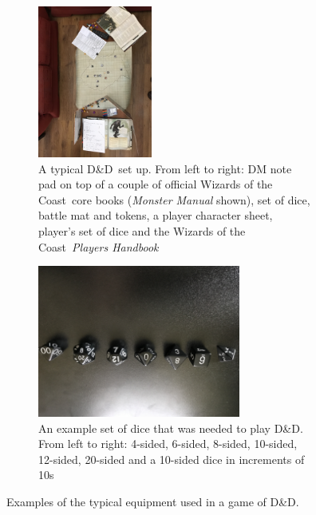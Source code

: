 \documentclass[final]{cmpreport}
\newcommand{\WotC}{Wizards of the Coast}
\newcommand{\dnd}{D\&D}
\begin{document}
			\begin{figure}[h] 
				\begin{subfigure}{0.5\textwidth}
					\includegraphics[width=\linewidth, height=5cm, angle=180]{DnD_Live.jpg}
					\caption{A typical \dnd \ set up. From left to right: DM note pad on top of a couple of official \WotC \ core books (\emph{Monster Manual} shown), set of dice, battle mat and tokens, a player character sheet, player's set of dice and the \WotC \ \emph{Players Handbook}} \label{fig:DnDLive}
				\end{subfigure}
				\begin{subfigure}{0.5\textwidth}
					\includegraphics[width=\linewidth, height=5cm, angle=180]{DnD_Dice.jpg}
					\caption{An example set of dice that was needed to play \dnd. From left to right: 4-sided, 6-sided, 8-sided, 10-sided, 12-sided, 20-sided and a 10-sided dice in increments of 10s} \label{fig:DnDDice}
				\end{subfigure}
				\caption{Examples of the typical equipment used in a game of \dnd.} \label{fig:dnd-equipment}
			\end{figure}
			
\end{document}
